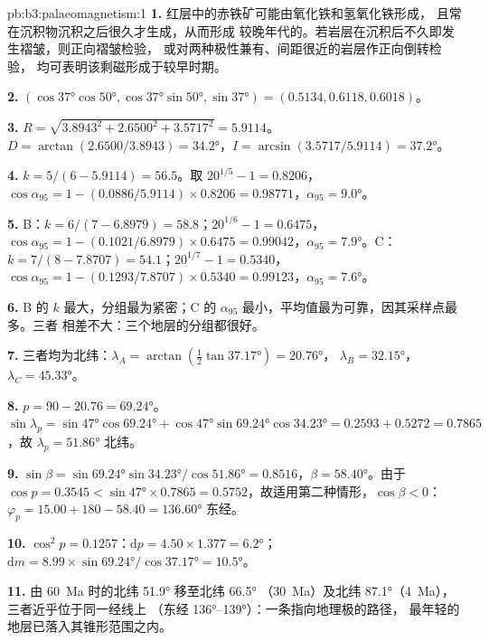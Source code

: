 \begin{solution}{pb:b3:palaeomagnetism:1}
\textbf{1.} 红层中的赤铁矿可能由氧化铁和氢氧化铁形成，
且常在沉积物沉积之后很久才生成，从而形成
较晚年代的。若岩层在沉积后不久即发生褶皱，则正向褶皱检验，
或对两种极性兼有、间距很近的岩层作正向倒转检验，
均可表明该剩磁形成于较早时期。

\textbf{2.} $(\cos\ang{37}\cos\ang{50}, \cos\ang{37}\sin\ang{50}, \sin\ang{37})
= (0.5134, 0.6118, 0.6018)$。

\textbf{3.} $R = \sqrt{3.8943^2 + 2.6500^2 + 3.5717^2} = 5.9114$。$D =
\arctan(2.6500/3.8943) = \ang{34.2}$，$I = \arcsin(3.5717/5.9114) = \ang{37.2}$。

\textbf{4.} $k = 5/(6 - 5.9114) = 56.5$。取 $20^{1/5} - 1 = 0.8206$，
$\cos\alpha_{95} = 1 - (0.0886/5.9114)\times0.8206 = 0.98771$，$\alpha_{95} =
\ang{9.0}$。

\textbf{5.} B：$k = 6/(7 - 6.8979) = 58.8$；$20^{1/6} - 1 = 0.6475$，
$\cos\alpha_{95} = 1 - (0.1021/6.8979)\times0.6475 = 0.99042$，$\alpha_{95} =
\ang{7.9}$。C：$k = 7/(8 - 7.8707) = 54.1$；$20^{1/7} - 1 = 0.5340$，
$\cos\alpha_{95} = 1 - (0.1293/7.8707)\times0.5340 = 0.99123$，$\alpha_{95} =
\ang{7.6}$。

\textbf{6.} B 的 $k$ 最大，分组最为紧密；C 的
$\alpha_{95}$ 最小，平均值最为可靠，因其采样点最多。三者
相差不大：三个地层的分组都很好。

\textbf{7.} 三者均为北纬：$\lambda_A = \arctan(\tfrac12\tan\ang{37.17}) = \ang{20.76}$，
$\lambda_B = \ang{32.15}$，$\lambda_C = \ang{45.33}$。

\textbf{8.} $p = 90 - 20.76 = \ang{69.24}$。$\sin\lambda_p =
\sin\ang{47}\cos\ang{69.24} + \cos\ang{47}\sin\ang{69.24}\cos\ang{34.23} =
0.2593 + 0.5272 = 0.7865$，故 $\lambda_p = \ang{51.86}$ 北纬。

\textbf{9.} $\sin\beta = \sin\ang{69.24}\sin\ang{34.23}/\cos\ang{51.86} =
0.8516$，$\beta = \ang{58.40}$。由于 $\cos p = 0.3545 < \sin\ang{47}\times
0.7865 = 0.5752$，故适用第二种情形，$\cos\beta < 0$：
$\varphi_p = 15.00 + 180 - 58.40 = \ang{136.60}$ 东经。

\textbf{10.} $\cos^2p = 0.1257$：$\mathrm dp = 4.50\times1.377 = \ang{6.2}$；
$\mathrm dm = 8.99\times\sin\ang{69.24}/\cos\ang{37.17} = \ang{10.5}$。

\textbf{11.} 由 \qty{60}{Ma} 时的北纬 \ang{51.9} 移至北纬 \ang{66.5}
（\qty{30}{Ma}）及北纬 \ang{87.1}（\qty{4}{Ma}），三者近乎位于同一经线上
（东经 \ang{136}--\ang{139}）：一条指向地理极的路径，
最年轻的地层已落入其锥形范围之内。


\end{solution}
